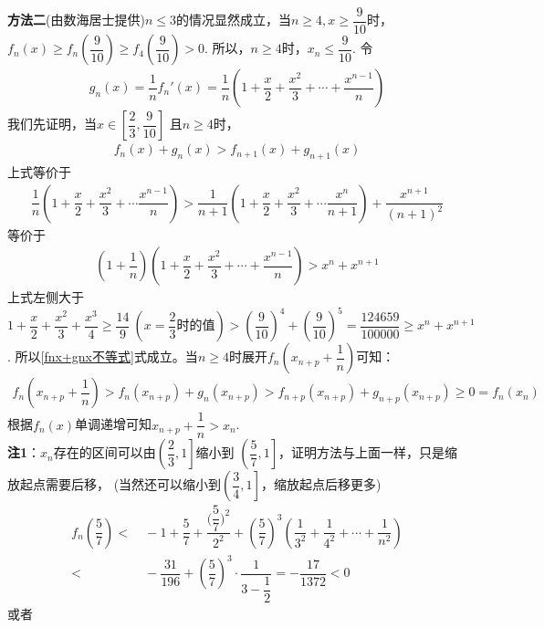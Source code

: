 \begin{enumerate}[label={【\textbf{例\thechapter.\arabic*}】},
 leftmargin=\inteval{\myenumleftmargin}pt,
 itemsep=\inteval{\myenumitempsep}pt,
 itemindent=\inteval{\myenumitemindent}pt]
\textbf{方法二}(由数海居士提供)\(n\leq3\)的情况显然成立，当\(n\geq4,x\geq\dfrac{9}{10}\)时，\(f_n(x)\geq f_n \left(\dfrac{9}{10}\right)\geq f_4\left(\dfrac{9}{10}\right)>0\).
所以，\(n\geq4\)时，\(x_n\leq\dfrac{9}{10}\). 令
\begin{gather*}
    g_n(x)=\dfrac{1}{n}f_n'(x)=
    \dfrac{1}{n}\left(1+\dfrac{x}{2}+\dfrac{x^2}{3}+\cdots+
    \dfrac{x^{n-1}}{n}\right)
\end{gather*}
我们先证明，当\(x\in \left[\dfrac{2}{3},\dfrac{9}{10}\right]\)
且\(n\geq4\)时，
\begin{gather}\label{fnx+gnx不等式}
    f_n(x)+g_n(x)>f_{n+1}(x)+g_{n+1}(x)
\end{gather}
上式等价于
\begin{align*}
    \dfrac{1}{n}\left(1+\dfrac{x}{2}+\dfrac{x^2}{3}+\cdots
    \dfrac{x^{n-1}}{n}\right)>
    \dfrac{1}{n+1}\left(1+\dfrac{x}{2}+\dfrac{x^2}{3}+\cdots
    \dfrac{x^n}{n+1}\right)+\dfrac{x^{n+1}}{(n+1)^2}
\end{align*}
等价于
\begin{align*}
    \left(1+\dfrac{1}{n}\right)\left(1+\dfrac{x}{2}+\dfrac{x^2}{3}+\cdots
    +\dfrac{x^{n-1}}{n}\right)>x^n+x^{n+1}
\end{align*}
上式左侧大于\(1+\dfrac{x}{2}+\dfrac{x^2}{3}+\dfrac{x^3}{4}\geq\dfrac{14}{9}\ \left(x=\dfrac{2}{3}\text{时的值}\right)>\left(\dfrac{9}{10}\right)^4+\left(\dfrac{9}{10}\right)^5=\dfrac{124659}{100000}\geq x^n+x^{n+1} \).
所以\eqref{fnx+gnx不等式}式成立。当\(n\geq4\)时展开\(f_n\left(x_{n+p}+\dfrac{1}{n}\right)\)可知：
\begin{gather*}
    f_n\left(x_{n+p}+\dfrac{1}{n}\right)>f_n(x_{n+p})+g_n(x_{n+p})>
    f_{n+p}(x_{n+p})+g_{n+p}(x_{n+p})\geq 0=f_n(x_n)
\end{gather*}
根据\(f_n(x)\)单调递增可知\(x_{n+p}+\dfrac{1}{n}>x_n\). \\
\textbf{注1}：$ x_n $存在的区间可以由$ \left(\dfrac{2}{3},1\right] $缩小到
$ \left(\dfrac{5}{7},1\right] $，证明方法与上面一样，只是缩放起点需要后移，
(当然还可以缩小到$ \left(\dfrac{3}{4},1\right] $，缩放起点后移更多)
\begin{align*}
    f_n\left(\dfrac{5}{7}\right)< &\ -1+\dfrac{5}{7}+
    \dfrac{\Big(\dfrac{5}{7}\Big)^2}{2^2}
    +\left(\dfrac{5}{7}\right)^3\left(\dfrac{1}{3^2}+
    \dfrac{1}{4^2}+\cdots+\dfrac{1}{n^2}\right) \\
    <&\ -\dfrac{31}{196}+\left(\dfrac{5}{7}\right)^3
    \cdot \dfrac{1}{3-\dfrac{1}{2}}  =-\dfrac{17}{1372}<0
\end{align*}
或者
\begin{align*}

\end{align*}
\end{enumerate}
